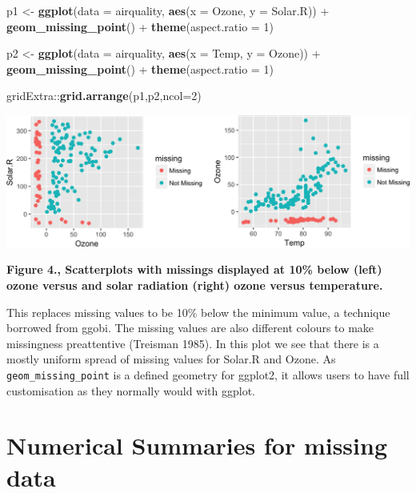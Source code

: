 \documentclass[]{article}
\newenvironment{Shaded}{\begin{snugshade}}{\end{snugshade}}
\newcommand{\KeywordTok}[1]{\textcolor[rgb]{0.13,0.29,0.53}{\textbf{{#1}}}}
\newcommand{\DataTypeTok}[1]{\textcolor[rgb]{0.13,0.29,0.53}{{#1}}}
\newcommand{\DecValTok}[1]{\textcolor[rgb]{0.00,0.00,0.81}{{#1}}}
\newcommand{\StringTok}[1]{\textcolor[rgb]{0.31,0.60,0.02}{{#1}}}
\newcommand{\NormalTok}[1]{{#1}}
\begin{document}
\begin{Shaded}
\begin{Highlighting}[]
\NormalTok{p1 <-}\StringTok{ }\KeywordTok{ggplot}\NormalTok{(}\DataTypeTok{data =} \NormalTok{airquality,}
       \KeywordTok{aes}\NormalTok{(}\DataTypeTok{x =} \NormalTok{Ozone,}
           \DataTypeTok{y =} \NormalTok{Solar.R)) +}\StringTok{ }
\StringTok{  }\KeywordTok{geom_missing_point}\NormalTok{() +}\StringTok{ }
\StringTok{  }\KeywordTok{theme}\NormalTok{(}\DataTypeTok{aspect.ratio =} \DecValTok{1}\NormalTok{)}

\NormalTok{p2 <-}\StringTok{ }\KeywordTok{ggplot}\NormalTok{(}\DataTypeTok{data =} \NormalTok{airquality,}
       \KeywordTok{aes}\NormalTok{(}\DataTypeTok{x =} \NormalTok{Temp,}
           \DataTypeTok{y =} \NormalTok{Ozone)) +}\StringTok{ }
\StringTok{  }\KeywordTok{geom_missing_point}\NormalTok{() +}\StringTok{ }
\StringTok{  }\KeywordTok{theme}\NormalTok{(}\DataTypeTok{aspect.ratio =} \DecValTok{1}\NormalTok{)}

\NormalTok{gridExtra::}\KeywordTok{grid.arrange}\NormalTok{(p1,p2,}\DataTypeTok{ncol=}\DecValTok{2}\NormalTok{)}
\end{Highlighting}
\end{Shaded}

\includegraphics{jsm2017_njtierney_files/figure-latex/ggeom_missing-1.png}

\textbf{Figure 4., Scatterplots with missings displayed at 10\% below
(left) ozone versus and solar radiation (right) ozone versus
temperature.}

This replaces missing values to be 10\% below the minimum value, a
technique borrowed from ggobi. The missing values are also different
colours to make missingness preattentive (Treisman 1985). In this plot
we see that there is a mostly uniform spread of missing values for
Solar.R and Ozone. As \texttt{geom\_missing\_point} is a defined
geometry for ggplot2, it allows users to have full customisation as they
normally would with ggplot.

\section{Numerical Summaries for missing
data}\label{numerical-summaries-for-missing-data}
\end{document}
